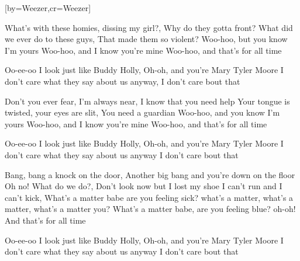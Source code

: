  

[by=Weezer,cr={Weezer}]




\beginverse
What's with these homies, dissing my girl?, \brk  Why do they gotta front?
What did we ever do to these guys, \brk  That made them so violent?
Woo-hoo, but you know I'm yours
Woo-hoo, and I know you're mine
Woo-hoo, and that's for all time 
\endverse

\beginchorus
Oo-ee-oo I look just like Buddy Holly, \brk  Oh-oh, and you're Mary Tyler Moore
I don't care what they say about us anyway, 
I don't care bout that 
\endchorus

\chordsoff
\beginverse
Don't you ever fear, I'm always near, \brk  I know that you need help
Your tongue is twisted, your eyes are slit, \brk  You need a guardian
Woo-hoo, and you know I'm yours
Woo-hoo, and I know you're mine
Woo-hoo, and that's for all time 
\endverse

\beginchorus
Oo-ee-oo I look just like Buddy Holly, \brk  Oh-oh, and you're Mary Tyler Moore
I don't care what they say about us anyway
 I don't care bout that
\endchorus

\beginverse
Bang, bang a knock on the door, \brk  Another big bang and you're down on the floor
Oh no! What do we do?, \brk  Don't look now but I lost my shoe
I can't run and I can't kick, \brk  What's a matter babe are you feeling sick?
what's a matter, what's a matter, what's a matter you?
What's a matter babe, are you feeling blue? oh-oh!
 And that's for all time
\endverse

\beginchorus
Oo-ee-oo I look just like Buddy Holly, \brk  Oh-oh, and you're Mary Tyler Moore
I don't care what they say about us anyway
 I don't care bout that
\endchorus

\endsong
